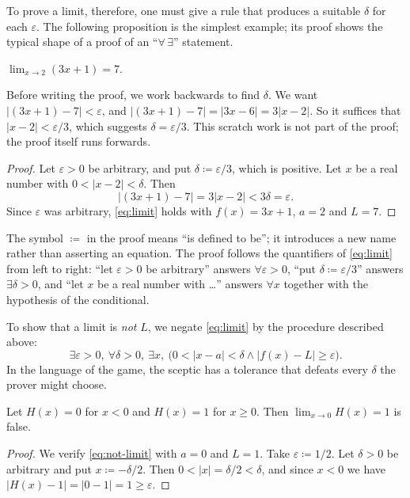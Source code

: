 To prove a limit, therefore, one must give a rule that produces a suitable $\delta$ for each $\varepsilon$. The following proposition is the simplest example; its proof shows the typical shape of a proof of an ``$\forall\,\exists$'' statement.

\begin{proposition}
\label{prop:limit-example}
$\lim_{x\to 2}(3x+1)=7$.
\end{proposition}

Before writing the proof, we work backwards to find $\delta$. We want $|(3x+1)-7|<\varepsilon$, and $|(3x+1)-7|=|3x-6|=3|x-2|$. So it suffices that $|x-2|<\varepsilon/3$, which suggests $\delta=\varepsilon/3$. This scratch work is not part of the proof; the proof itself runs forwards.

\begin{proof}
Let $\varepsilon>0$ be arbitrary, and put $\delta\coloneqq\varepsilon/3$, which is positive. Let $x$ be a real number with $0<|x-2|<\delta$. Then
\[
|(3x+1)-7|=3|x-2|<3\delta=\varepsilon .
\]
Since $\varepsilon$ was arbitrary, \eqref{eq:limit} holds with $f(x)=3x+1$, $a=2$ and $L=7$.
\end{proof}

The symbol $\coloneqq$ in the proof means ``is defined to be''; it introduces a new name rather than asserting an equation. The proof follows the quantifiers of \eqref{eq:limit} from left to right: ``let $\varepsilon>0$ be arbitrary'' answers $\forall\varepsilon>0$, ``put $\delta\coloneqq\varepsilon/3$'' answers $\exists\delta>0$, and ``let $x$ be a real number with \ldots'' answers $\forall x$ together with the hypothesis of the conditional.

To show that a limit is \emph{not} $L$, we negate \eqref{eq:limit} by the procedure described above:
\begin{equation}
\exists\varepsilon>0,\ \forall\delta>0,\ \exists x,\ \bigl(0<|x-a|<\delta\wedge|f(x)-L|\ge\varepsilon\bigr).
\label{eq:not-limit}
\end{equation}
In the language of the game, the sceptic has a tolerance that defeats every $\delta$ the prover might choose.

\begin{proposition}
\label{prop:step-limit}
Let $H(x)=0$ for $x<0$ and $H(x)=1$ for $x\ge 0$. Then $\lim_{x\to 0}H(x)=1$ is false.
\end{proposition}

\begin{proof}
We verify \eqref{eq:not-limit} with $a=0$ and $L=1$. Take $\varepsilon\coloneqq 1/2$. Let $\delta>0$ be arbitrary and put $x\coloneqq-\delta/2$. Then $0<|x|=\delta/2<\delta$, and since $x<0$ we have $|H(x)-1|=|0-1|=1\ge\varepsilon$.
\end{proof}

